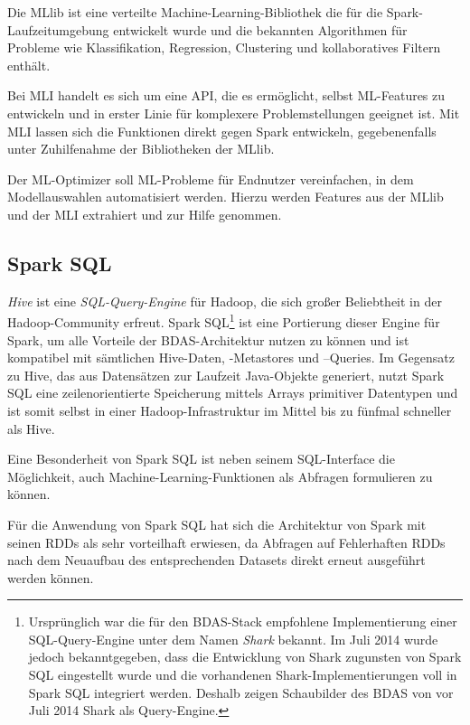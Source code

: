Die MLlib ist eine verteilte Machine-Learning-Bibliothek die für die Spark-Laufzeitumgebung entwickelt wurde und die bekannten Algorithmen für Probleme wie Klassifikation, Regression, Clustering und kollaboratives Filtern enthält.

Bei MLI handelt es sich um eine API, die es ermöglicht, selbst ML-Features zu entwickeln und in erster Linie für komplexere Problemstellungen geeignet ist. Mit MLI lassen sich die Funktionen direkt gegen Spark entwickeln, gegebenenfalls unter Zuhilfenahme der Bibliotheken der MLlib.

Der ML-Optimizer soll ML-Probleme für Endnutzer vereinfachen, in dem Modellauswahlen automatisiert werden. Hierzu werden Features aus der MLlib und der MLI extrahiert und zur Hilfe genommen.



\subsection{Spark SQL}
\label{section:spark SQL}


\textit{Hive} ist eine \textit{SQL-Query-Engine} für Hadoop, die sich großer Beliebtheit in der Hadoop-Community erfreut. Spark SQL\footnote{Ursprünglich war die für den BDAS-Stack empfohlene Implementierung einer SQL-Query-Engine unter dem Namen \textit{Shark} bekannt. Im Juli 2014 wurde jedoch bekanntgegeben, dass die Entwicklung von Shark zugunsten von Spark SQL eingestellt wurde und die vorhandenen Shark-Implementierungen voll in Spark SQL integriert werden. Deshalb zeigen Schaubilder des BDAS von vor Juli 2014 Shark als Query-Engine.} ist eine Portierung dieser Engine für Spark, um alle Vorteile der BDAS-Architektur nutzen zu können und ist kompatibel mit sämtlichen Hive-Daten, -Metastores und –Queries. Im Gegensatz zu Hive, das aus Datensätzen zur Laufzeit Java-Objekte generiert, nutzt Spark SQL eine zeilenorientierte Speicherung mittels Arrays primitiver Datentypen und ist somit selbst in einer Hadoop-Infrastruktur im Mittel bis zu fünfmal schneller als Hive. 

Eine Besonderheit von Spark SQL ist neben seinem SQL-Interface die Möglichkeit, auch Machine-Learning-Funktionen als Abfragen formulieren zu können. 

Für die Anwendung von Spark SQL hat sich die Architektur von Spark mit seinen RDDs als sehr vorteilhaft erwiesen, da Abfragen auf Fehlerhaften RDDs nach dem Neuaufbau des entsprechenden Datasets direkt erneut ausgeführt werden können. 

